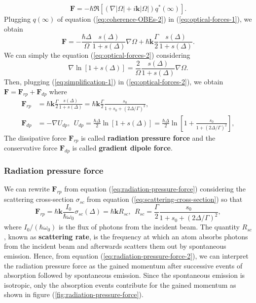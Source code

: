 {\begin{equation}
	\mathbf{F} = -\hbar \Re[(\nabla|\Omega| + i\mathbf{k}|\Omega|)q^*(\infty)].
	\label{eq:optical-forces-1}
\end{equation}
Plugging $ q(\infty) $ of equation (\ref{eq:coherence-OBEs-2}) in (\ref{eq:optical-forces-1}), we obtain
\begin{equation}
	\mathbf{F} = -\frac{\hbar \Delta}{\Omega} \frac{s(\Delta)}{1 + s(\Delta)}\nabla \Omega  + \hbar\mathbf{k} \frac{\Gamma}{2} \frac{s(\Delta)}{1 + s(\Delta)}.
	\label{eq:optical-forces-2}
\end{equation}
We can simply the equation (\ref{eq:optical-forces-2}) considering 
\begin{equation}
	\nabla \ln\left[1 + s(\Delta) \right] = \frac{2}{\Omega} \frac{s(\Delta)}{1 + s(\Delta)} \nabla \Omega.
	\label{eq:simplification-1}
\end{equation}
Then, plugging (\ref{eq:simplification-1}) in (\ref{eq:optical-forces-2}), we obtain $ \mathbf{F} = \mathbf{F}_{rp} + \mathbf{F}_{dp} $ where
\begin{align}
	\mathbf{F}_{rp} &= \hbar \mathbf{k} \frac{\Gamma}{2} \frac{s(\Delta)}{1 + s(\Delta)} = \hbar \mathbf{k} \frac{\Gamma}{2} \frac{s_0}{1 + s_0 + (2\Delta/\Gamma)^2},
	\label{eq:radiation-pressure-force}
	\\
	\mathbf{F}_{dp} &= -\nabla U_{dp},\ \ U_{dp} = \frac{\hbar \Delta}{2} \ln\left[1 + s(\Delta) \right] = \frac{\hbar \Delta}{2} \ln\left[1 + \frac{s_0}{1 + (2\Delta/\Gamma)^2} \right],
	\label{eq:gradient-dipole-force}
\end{align}
The dissipative force $ \mathbf{F}_{rp} $ is called \textbf{radiation pressure force} and the conservative force $ \mathbf{F}_{dp} $ is called \textbf{gradient dipole force}.

\subsubsection{Radiation pressure force}
\label{sec:radiation-pressure-force}

We can rewrite $ \mathbf{F}_{rp} $ from equation (\ref{eq:radiation-pressure-force}) considering the scattering cross-section $ \sigma_{sc} $ from equation (\ref{eq:scattering-cross-section}) so that
\begin{equation}
	\mathbf{F}_{rp} = \hbar \mathbf{k} \frac{I_0}{\hbar \omega_0} \sigma_{sc}(\Delta) = \hbar \mathbf{k} R_{sc},\ \ R_{sc} = \frac{\Gamma}{2}\frac{s_0}{1 + s_0 +  (2\Delta / \Gamma)^2},
	\label{eq:radiation-pressure-force-2}
\end{equation}
where $ I_0 / (\hbar \omega_0) $ is the flux of photons from the incident beam. The quantity $ R_{sc} $, known as \textbf{scattering rate}, is the frequency at which an atom absorbs photons from the incident beam and afterwards scatters them out by spontaneous emission. Hence, from equation (\ref{eq:radiation-pressure-force-2}), we can interpret the radiation pressure force as the gained momentum after successive events of absorption followed by spontaneous emission. Since the spontaneous emission is isotropic, only the absorption events contribute for the gained momentum as shown in figure (\ref{fig:radiation-pressure-force}).

}
